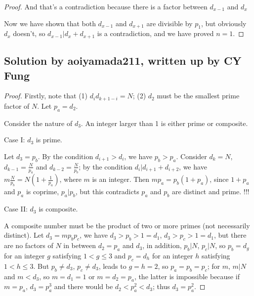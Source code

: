 \begin{proof}
And that's a contradiction because there is a factor between $ d_{x-1} $ and $ d_x $

Now we have shown that both $ d_{x - 1} $ and $ d_{x + 1} $ are divisible by $ p_1 $, but obviously $ d_x $ doesn't, so $ d_{x-1} | d_x + d_{x+1} $ is a contradiction, and we have proved $ n = 1 $.

\end{proof}

\subsection*{Solution by aoiyamada211, written up by CY Fung}

\begin{proof}

Firstly, note that (1) $d_i d_{k+1-i} = N$; (2) $d_2$ must be the smallest prime factor of $N$. Let $p_a = d_2$.

\hspace{3em}

Consider the nature of $d_3$. An integer larger than 1 is either prime or composite.

\hspace{3em}

Case I: $d_3$ is prime.

Let $d_3 = p_b$. By the condition $d_{i+1} > d_i$, we have $p_b > p_a$. Consider $d_k = N$, $d_{k-1} = \frac{N}{p_a}$ and $d_{k-2} = \frac{N}{p_b}$; by the condition $d_i | d_{i+1} + d_{i+2}$, we have $ m \frac{N}{p_b} = N(1+\frac{1}{p_a}) $, where $m$ is an integer. Then $ m p_a = p_b (1 + p_a)$, since $1+p_a$ and $p_a$ is coprime, $p_a | p_b$, but this contradicts $p_a$ and $p_b$ are distinct and prime. !!!

\hspace{3em}

Case II: $d_3$ is composite.

A composite number must be the product of two or more primes (not necessarily distinct). Let $d_3 = m p_b p_c $, we have $d_3 > p_b > 1 = d_1 $, $d_3 > p_c > 1 = d_1$,  but there are no factors of $N$ in between $d_2 = p_a$ and $d_3$, in addition, $p_b | N$, $p_c | N$, so $p_b = d_g$ for an integer $g$ satisfying $1 < g \le 3$ and $p_c = d_h$ for an integer $h$ satisfying $1 < h \le 3$. But $p_b \ne d_3$, $p_c \ne d_3$, leads to $g = h = 2$, so $p_a = p_b = p_c$; for $m$, $m|N$ and $ m < d_3$, so $m=d_1 = 1$ or $m = d_2 = p_a$, the latter is impossible because if $m = p_a$, $d_3 = p_a^3$ and there would be $d_2 < p_a^2 < d_3$; thus $d_3 = p_a^2$.


\end{proof}
